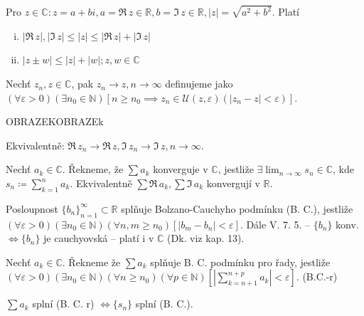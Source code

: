 \begin{poznamka}
  Pro $z \in \mathbb C: z = a + bi, a = \Re \, z \in \mathbb R, b = \Im \, z \in \mathbb R, |z| = \sqrt{a^2+b^2}$. Platí \begin{enumerate}[i)]
    \item $|\Re \, z|, |\Im \, z| \leq |z| \leq |\Re \, z| + |\Im \, z|$
    \item $|z \pm w| \leq |z| + |w|; z, w \in \mathbb C$
  \end{enumerate}
\end{poznamka}

\begin{definice}
  Nechť $z_n, z \in \mathbb C$, pak $z_n \to z, n \to \infty$ definujeme jako $(\forall \varepsilon > 0)(\exists n_0 \in \mathbb N)[n \geq n_0 \implies z_n \in \mathscr U(z, \varepsilon)(|z_n-z|<\varepsilon)]$.

  OBRAZEKOBRAZEk

  Ekvivalentně: $\Re \, z_n \to \Re \, z, \Im \, z_n \to \Im \, z, n \to \infty$.
\end{definice}

\begin{definice}
  Nechť $a_k \in \mathbb C$. Řekneme, že $\sum a_k$ konverguje v $\mathbb C$, jestliže $\exists \lim_{n \to \infty} s_n \in \mathbb C$, kde $s_n \coloneq \sum_{k=1}^{n} a_k$. Ekvivalentně $\sum \Re \, a_k, \sum \Im \, a_k$ konvergují v $\mathbb R$.
\end{definice}

\begin{poznamka}
  Posloupnost $\{b_n\}_{n=1}^{\infty} \subset \mathbb R$ splňuje Bolzano-Cauchyho podmínku (B. C.), jestliže $(\forall \varepsilon > 0)(\exists n_0 \in \mathbb N)(\forall n, m \geq n_0)[|b_m-b_n|<\varepsilon]$. Dále V. 7. 5. -- $\{b_n\}$ konv. $\iff \{b_n\}$ je cauchyovská -- platí i v $\mathbb C$ (Dk. viz kap. 13).
\end{poznamka}

\begin{definice}
  Nechť $a_k \in \mathbb C$. Řekneme že $\sum a_k$ splňuje B. C. podmínku pro řady, jestliže $(\forall \varepsilon>0)(\exists n_0 \in \mathbb N)(\forall n \geq n_0)(\forall p \in \mathbb N)[|\sum_{k=n+1}^{n+p}a_k|<\varepsilon]$. (B.C.-r)
\end{definice}

\begin{poznamka}
  $\sum a_k$ splní (B. C. r) $\iff \{s_n\}$ splní (B. C.).
\end{poznamka}

